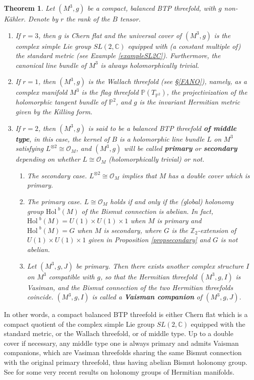 \documentclass{amsart}
\numberwithin{equation}{section}
\newtheorem{theorem} {Theorem} [section]
\theoremstyle{definition}
\renewcommand{\1}{\mathds{1}}
\renewcommand{\>}{\rightarrow}
\begin{document}
\begin{theorem} \label{thm1.1}
Let $(M^3,g)$ be a compact, balanced BTP threefold, with $g$ non-K\"ahler. Denote by $r$ the rank of the $B$ tensor.
\begin{enumerate}
\item If $r=3$, then $g$ is Chern flat and the universal cover of $(M^3,g)$ is the complex simple Lie group $SL(2,{\mathbb C})$ equipped with (a constant multiple of) the standard metric (see Example \ref{exampleSL2C}). Furthermore, the canonical line bundle of $M^3$ is always holomorphically trivial.
\item If $r=1$, then $(M^3,g)$ is the Wallach threefold (see \S \ref{FANO}), namely, as a complex manifold $M^3$ is the flag threefold ${\mathbb P}(T_{{\mathbb P}^2})$, the projectivization of the holomorphic tangent bundle of ${\mathbb P}^2$, and $g$ is the invariant Hermitian metric given by the Killing form.
\item If $r=2$, then $(M^3,g)$ is said to be a balanced BTP threefold {\bf of middle type}, in this case, the kernel of $B$ is a holomorphic line bundle $L$ on $M^3$ satisfying $L^{\otimes 2}\cong {\mathcal O}_M$, and $(M^3,g)$ will be called {\bf primary} or {\bf secondary} depending on whether $L\cong {\mathcal O}_M$ (holomorphically trivial) or not.
    \begin{enumerate}
    \item The secondary case. $L^{\otimes 2}\cong {\mathcal O}_M$ implies that $M$ has a double cover which is primary.
    \item The primary case. $L\cong {\mathcal O}_M$ holds if and only if the (global) holonomy group $\mbox{Hol}^{\,\,b}(M)$ of the Bismut connection is abelian. In fact, $\mbox{Hol}^{\,\,b}(M) = U(1)\!\times\!U(1)\!\times\!1$ when $M$ is primary and  $\mbox{Hol}^{\,\,b}(M) =G$ when $M$ is secondary, where $G$ is the ${\mathbb Z}_2$-extension of $U(1)\!\times\!U(1)\!\times\!1$ given in Proposition \ref{propsecondary} and $G$ is not abelian.
    \item Let $(M^3,g,J)$ be primary. Then there exists another complex structure $I$ on $M^3$ compatible with $g$, so that the Hermitian threefold $(M^3,g,I)$ is Vasiman, and the Bismut connection of the two Hermitian threefolds coincide. $(M^3,g,I)$ is called a {\bf Vaisman companion} of $(M^3,g,J)$.
    \end{enumerate}
\end{enumerate}
\end{theorem}

In other words, a compact balanced BTP threefold is either Chern flat which is a compact quotient of the complex simple Lie group $SL(2,{\mathbb C})$ equipped with the standard metric, or the Wallach threefold, or of middle type. Up to a double cover if necessary, any middle type one is always primary and admits Vaisman companions, which are Vasiman threefolds sharing the same Bismut connection with the original primary threefold, thus having abelian Bismut holonomy group. See \cite{N} for some very recent results on holonomy groups of Hermitian manifolds.
\end{document}

